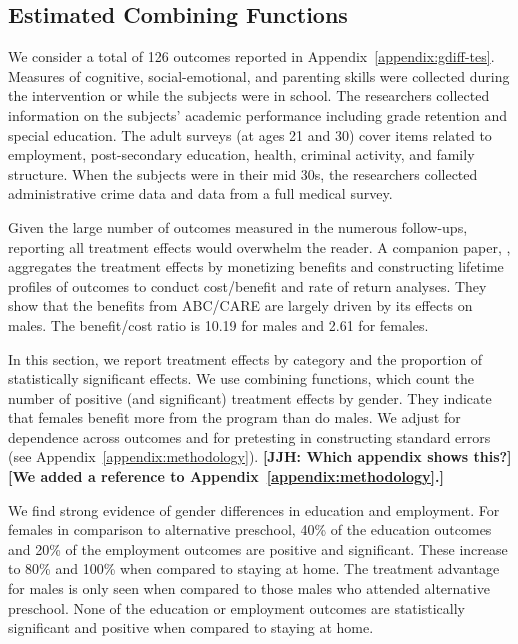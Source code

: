 \subsection{Estimated Combining Functions}

We consider a total of 126 outcomes reported in Appendix~\ref{appendix:gdiff-tes}. Measures of cognitive, social-emotional, and parenting skills were collected during the intervention or while the subjects were in school. The researchers collected information on the subjects' academic performance including grade retention and special education. The adult surveys (at ages 21 and 30) cover items related to employment, post-secondary education, health, criminal activity, and family structure. When the subjects were in their mid 30s, the researchers collected administrative crime data and data from a full medical survey.

Given the large number of outcomes measured in the numerous follow-ups, reporting all treatment effects would overwhelm the reader. A companion paper, \citet{Garcia_Heckman_Leaf_etal_2017_Comp_CBA_Unpublished}, aggregates the treatment effects by monetizing benefits and constructing lifetime profiles of outcomes to conduct cost/benefit and rate of return analyses. They show that the benefits from ABC/CARE are largely driven by its effects on males. The benefit/cost ratio is 10.19 for males and 2.61 for females. 

In this section, we report treatment effects by category and the proportion of statistically significant effects. We use combining functions, which count the number of positive (and significant) treatment effects by gender. They indicate that females benefit more from the program than do males. We adjust for dependence across outcomes and for pretesting in constructing standard errors (see Appendix~\ref{appendix:methodology}). \textbf{[JJH: Which appendix shows this?][We added a reference to Appendix~\ref{appendix:methodology}.]}

We find strong evidence of gender differences in education and employment. For females in comparison to alternative preschool, 40\% of the education outcomes and 20\% of the employment outcomes are positive and significant. These increase to 80\% and 100\% when compared to staying at home. The treatment advantage for males is only seen when compared to those males who attended alternative preschool. None of the education or employment outcomes are statistically significant and positive when compared to staying at home.


